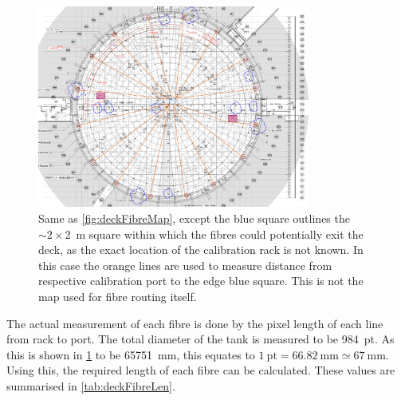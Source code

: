 \documentclass[a4paper,11pt]{article}
\let\oldsim\sim
\renewcommand{\sim}{{\oldsim}}
\begin{document}
\begin{figure}[h!]
\centering
\includegraphics[width=0.8\textwidth]{deckFibreMeasure}
\caption{Same as \cref{fig:deckFibreMap}, except the blue square outlines the $\sim 2\times 2$~m square within which the fibres could potentially exit the deck, as the exact location of the calibration rack is not known. In this case the orange lines are used to measure distance from respective calibration port to the edge blue square. This is not the map used for fibre routing itself.}\label{fig:deckFibreMeasure}
\end{figure}
The actual measurement of each fibre is done by the pixel length of each line from rack to port. The total diameter of the tank is measured to be 984~pt. As this is shown in \cref{fig:deckFibreMeasure} to be 65751~mm, this equates to $1~\text{pt} = 66.82~\text{mm} \simeq 67~\text{mm}$. Using this, the required length of each fibre can be calculated. These values are summarised in \cref{tab:deckFibreLen}.
\end{document}
